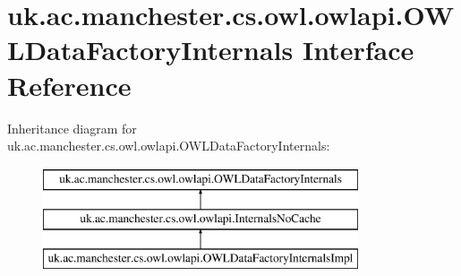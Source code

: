\hypertarget{interfaceuk_1_1ac_1_1manchester_1_1cs_1_1owl_1_1owlapi_1_1_o_w_l_data_factory_internals}{\section{uk.\-ac.\-manchester.\-cs.\-owl.\-owlapi.\-O\-W\-L\-Data\-Factory\-Internals Interface Reference}
\label{interfaceuk_1_1ac_1_1manchester_1_1cs_1_1owl_1_1owlapi_1_1_o_w_l_data_factory_internals}
}
Inheritance diagram for uk.\-ac.\-manchester.\-cs.\-owl.\-owlapi.\-O\-W\-L\-Data\-Factory\-Internals\-:\begin{figure}[H]
\begin{center}
\leavevmode
\includegraphics[height=3.000000cm]{interfaceuk_1_1ac_1_1manchester_1_1cs_1_1owl_1_1owlapi_1_1_o_w_l_data_factory_internals}
\end{center}
\end{figure}
